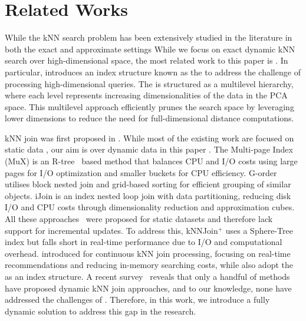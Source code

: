 \section{Related Works}\label{sec:related-works}

%
While the kNN search problem has been extensively studied in the literature in both the exact \cite{yu2001indexing, cui2003contorting, cui2005indexing, garcia2010k, wang2013pl, xiao2016parallel, pan2020new, muhr2022hybrid} and approximate \cite{bawa2005lsh, jegou2010product, muja2014scalable, wang2019new, li2019approximate, song2020brepartition} settings
%
While we focus on exact dynamic kNN search over high-dimensional space, 
the most related work to this paper is \cite{cui2005indexing}.
%
In particular, \cite{cui2005indexing} introduces an index structure known as the \deltatree to address the challenge of processing high-dimensional queries.
%
The \deltatree is structured as a multilevel hierarchy, where each level represents increasing dimensionalities of the data in the PCA space.
%
This multilevel approach efficiently prunes the search space by leveraging lower dimensions to reduce the need for full-dimensional distance computations.

%
kNN join was first proposed in \cite{bohm2003supporting, bohm2004k}. While most of the existing work are focused on static data \cite{bohm2004k, xia2004gorder, yu2007efficient}, our aim is over dynamic data in this paper \cite{yu2010high, yang2014continuous, ukey2022efficient, ukey2023efficient,ukey2023knn}.
%
The Multi-page Index (MuX) \cite{bohm2001cost, bohm2004k} is an R-tree~\cite{guttman1984r} based method that balances CPU and I/O costs using large pages for I/O optimization and smaller buckets for CPU efficiency.
%
G-order \cite{xia2004gorder} utilises block nested join and grid-based sorting for efficient grouping of similar objects.
%
iJoin \cite{yu2007efficient} is an index nested loop join with data partitioning, reducing disk I/O and CPU costs through dimensionality reduction and approximation cubes.
%
All these approaches~\cite{bohm2004k, xia2004gorder, yu2007efficient} were proposed for static datasets and therefore lack support for incremental updates. To address this, kNNJoin$^+$ \cite{yu2010high} uses a Sphere-Tree index but falls short in real-time performance due to I/O and computational overhead.
%
\cite{yang2014continuous} introduced \hdrtree for continuous kNN join processing, focusing on real-time recommendations and reducing in-memory searching costs, while \cite{ukey2022efficient, ukey2023efficient, ukey2023knn} also adopt the \hdrtree as an index structure.
%
A recent survey~\cite{ukey2023survey} reveals that only a handful of methods have proposed dynamic kNN join approaches, and to our knowledge, none have addressed the challenges of \fdknnj. Therefore, in this work, we introduce a fully dynamic solution to address this gap in the research.


